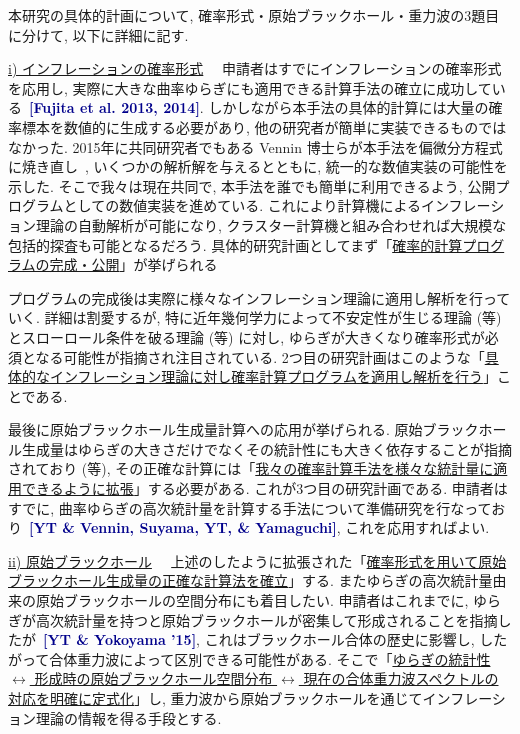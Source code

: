 \documentclass[11pt,a4paper,uplatex,dvipdfmx]{ujarticle} 		%
\newcommand{\研究課題名}{確率解析・原始ブラックホール・重力波観測から迫るインフレーション}
\newcommand{\研究機関名}{名古屋大学}
\newcommand{\研究代表者氏名}{多田祐一郎}
\newcommand{\研究期間の最終元号年度}{6}  %
\newcommand{\stochastic}[1]{\noindent \colorbox{stochastic}{\ul{i) #1}}~~}
\newcommand{\PBH}[1]{\noindent\colorbox{PBH}{\ul{ii) #1}}~~}
\newcommand{\Blue}[1]{\textcolor{darkblue}{\sffamily\gtfamily\bfseries #1}}
\begin{document}
\noindent
本研究の具体的計画について, 確率形式・原始ブラックホール・重力波の3題目に分けて, 以下に詳細に記す.

\stochastic{インフレーションの確率形式}
申請者はすでにインフレーションの確率形式を応用し, 実際に大きな曲率ゆらぎにも適用できる計算手法の確立に成功している~\Blue{[Fujita et al. 2013, 2014]}.
しかしながら本手法の具体的計算には大量の確率標本を数値的に生成する必要があり, 他の研究者が簡単に実装できるものではなかった. 
2015年に共同研究者でもある Vennin 博士らが本手法を偏微分方程式に焼き直し~\cite{Vennin:2015hra}, 
いくつかの解析解を与えるとともに, 統一的な数値実装の可能性を示した. そこで我々は現在共同で, 本手法を誰でも簡単に利用できるよう, 
公開プログラムとしての数値実装を進めている. 
これにより計算機によるインフレーション理論の自動解析が可能になり, クラスター計算機と組み合わせれば大規模な包括的探査も可能となるだろう.
具体的研究計画としてまず「\ul{確率的計算プログラムの完成・公開}」が挙げられる

プログラムの完成後は実際に様々なインフレーション理論に適用し解析を行っていく. 詳細は割愛するが, 特に近年幾何学力によって不安定性が生じる理論 
(\cite{Renaux-Petel:2015mga}等) とスローロール条件を破る理論 (\cite{Ezquiaga:2018gbw}等) に対し, 
ゆらぎが大きくなり確率形式が必須となる可能性が指摘され注目されている.
2つ目の研究計画はこのような「\ul{具体的なインフレーション理論に対し確率計算プログラムを適用し解析を行う}」ことである.

最後に原始ブラックホール生成量計算への応用が挙げられる.
原始ブラックホール生成量はゆらぎの大きさだけでなくその統計性にも大きく依存することが指摘されており (\cite{Ezquiaga:2019ftu}等),
その正確な計算には「\ul{我々の確率計算手法を様々な統計量に適用できるように拡張}」する必要がある.
これが3つ目の研究計画である. 申請者はすでに, 曲率ゆらぎの高次統計量を計算する手法について準備研究を行なっており~\Blue{[YT \& Vennin, Suyama, YT, \& Yamaguchi]}, これを応用すればよい.

\medskip


\PBH{原始ブラックホール}
上述のしたように拡張された「\ul{確率形式を用いて原始ブラックホール生成量の正確な計算法を確立}」する.
またゆらぎの高次統計量由来の原始ブラックホールの空間分布にも着目したい.
申請者はこれまでに, ゆらぎが高次統計量を持つと原始ブラックホールが密集して形成されることを指摘したが~\Blue{[YT \& Yokoyama '15]},
これはブラックホール合体の歴史に影響し, したがって合体重力波によって区別できる可能性がある.
そこで「\ul{ゆらぎの統計性 {$\leftrightarrow$} 形成時の原始ブラックホール空間分布 {$\leftrightarrow$} 現在の合体重力波スペクトルの対応を明確に定式化}」し, 
重力波から原始ブラックホールを通じてインフレーション理論の情報を得る手段とする.
\end{document}
